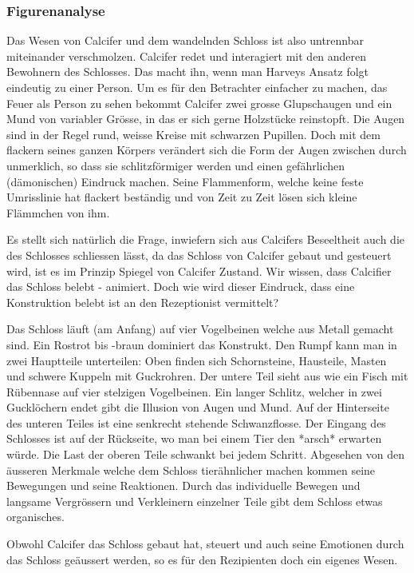 \subsubsection*{Figurenanalyse}
Das Wesen von Calcifer und dem wandelnden Schloss ist also untrennbar miteinander verschmolzen. Calcifer redet und interagiert mit den anderen Bewohnern des Schlosses. Das macht ihn, wenn man Harveys Ansatz folgt eindeutig zu einer Person. Um es für den Betrachter einfacher zu machen, das Feuer als Person zu sehen bekommt Calcifer zwei grosse Glupschaugen und ein Mund von variabler Grösse, in das er sich gerne Holzstücke reinstopft. Die Augen sind in der Regel rund, weisse Kreise mit schwarzen Pupillen. Doch mit dem flackern seines ganzen Körpers verändert sich die Form der Augen zwischen durch unmerklich, so dass sie schlitzförmiger werden und einen gefährlichen (dämonischen) Eindruck machen. Seine Flammenform, welche keine feste Umrisslinie hat flackert beständig und von Zeit zu Zeit lösen sich kleine Flämmchen von ihm. 

Es stellt sich natürlich die Frage, inwiefern sich aus Calcifers Beseeltheit auch die des Schlosses schliessen lässt, da das Schloss von Calcifer gebaut und gesteuert wird, ist es im Prinzip Spiegel von Calcifer Zustand. Wir wissen, dass Calcifier das Schloss belebt - animiert. Doch wie wird dieser Eindruck, dass eine Konstruktion belebt ist an den Rezeptionist vermittelt?

Das Schloss läuft (am Anfang) auf vier Vogelbeinen welche aus Metall gemacht sind. Ein Rostrot bis -braun dominiert das Konstrukt. Den Rumpf kann man in zwei Hauptteile unterteilen: Oben finden sich Schornsteine, Hausteile, Masten und schwere Kuppeln mit Guckrohren. Der untere Teil sieht aus wie ein Fisch mit Rübennase auf vier stelzigen Vogelbeinen. Ein langer Schlitz, welcher in zwei Gucklöchern endet gibt die Illusion von Augen und Mund. Auf der Hinterseite des unteren Teiles ist eine senkrecht stehende Schwanzflosse. Der Eingang des Schlosses ist auf der Rückseite, wo man bei einem Tier den *arsch* erwarten würde. Die Last der oberen Teile schwankt bei jedem Schritt.
Abgesehen von den äusseren Merkmale welche dem Schloss tierähnlicher machen kommen seine Bewegungen und seine Reaktionen. Durch das individuelle Bewegen und langsame Vergrössern und Verkleinern einzelner Teile gibt dem Schloss etwas organisches. 

Obwohl Calcifer das Schloss gebaut hat, steuert und auch seine Emotionen durch das Schloss geäussert werden, so es für den Rezipienten doch ein eigenes Wesen.

